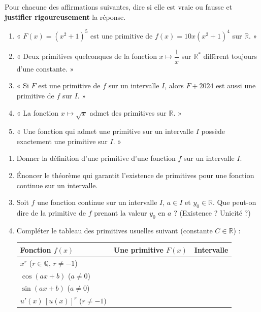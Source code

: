 \documentclass[11pt]{article}
\begin{document}
\begin{exercice}
Pour chacune des affirmations suivantes, dire si elle est vraie ou fausse et \textbf{justifier rigoureusement} la réponse.
\begin{enumerate}
\item « $F(x) = (x^2+1)^5$ est une primitive de $f(x) = 10x(x^2+1)^4$ sur $\mathbb{R}$. »
\item « Deux primitives quelconques de la fonction $x \mapsto \dfrac{1}{x}$ sur $\mathbb{R}^*$ diffèrent toujours d'une constante. »
\item « Si $F$ est une primitive de $f$ sur un intervalle $I$, alors $F + 2024$ est aussi une primitive de $f$ sur $I$. »
\item « La fonction $x \mapsto \sqrt{x}$ admet des primitives sur $\mathbb{R}$. »
\item « Une fonction qui admet une primitive sur un intervalle $I$ possède exactement une primitive sur $I$. »
\end{enumerate}
\end{exercice}

\begin{exercice}
\begin{enumerate}
\item Donner la définition d'une primitive d'une fonction $f$ sur un intervalle $I$.
\item Énoncer le théorème qui garantit l'existence de primitives pour une fonction continue sur un intervalle.
\item Soit $f$ une fonction continue sur un intervalle $I$, $a \in I$ et $y_0 \in \mathbb{R}$. Que peut-on dire de la primitive de $f$ prenant la valeur $y_0$ en $a$ ? (Existence ? Unicité ?)
\item Compléter le tableau des primitives usuelles suivant (constante $C \in \mathbb{R}$) :
\begin{center}
\begin{tabularx}{\linewidth}{|X|X|X|}
\hline
\rowcolor{popblueL}
\textbf{Fonction $f(x)$} & \textbf{Une primitive $F(x)$} & \textbf{Intervalle} \\
\hline
$x^r$ ($r \in \mathbb{Q}$, $r \neq -1$) & & \\
\hline
$\cos(ax+b)$ ($a \neq 0$) & & \\
\hline
$\sin(ax+b)$ ($a \neq 0$) & & \\
\hline
$u'(x)\,[u(x)]^r$ ($r \neq -1$) & & \\
\hline
\end{tabularx}
\end{center}
\end{enumerate}
\end{exercice}
\end{document}
